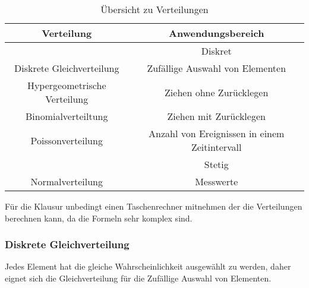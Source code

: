 \documentclass[12pt]{scrartcl}
\begin{document}
\begin{table}[h]
    \begin{tabular}{ | c | c | }
        \hline
        Verteilung                   & Anwendungsbereich                             \\
        \hline
        \hline
                                     & Diskret                                       \\
        \hline
        Diskrete Gleichverteilung    & Zufällige Auswahl von Elementen               \\
        \hline
        Hypergeometrische Verteilung & Ziehen ohne Zurücklegen                       \\
        \hline
        Binomialverteiltung          & Ziehen mit Zurücklegen                        \\
        \hline
        Poissonverteilung            & Anzahl von Ereignissen in einem Zeitintervall \\
        \hline
        \hline
                                     & Stetig                                        \\
        \hline
        Normalverteilung             & Messwerte                                     \\
        \hline
    \end{tabular}
    \caption{Übersicht zu Verteilungen}
\end{table}

Für die Klausur unbedingt einen Taschenrechner mitnehmen der die Verteilungen berechnen kann,
da die Formeln sehr komplex sind.

\subsubsection{Diskrete Gleichverteilung}

Jedes Element hat die gleiche Wahrscheinlichkeit ausgewählt zu werden,
daher eignet sich die Gleichverteilung für die Zufällige Auswahl von Elementen.
\end{document}
